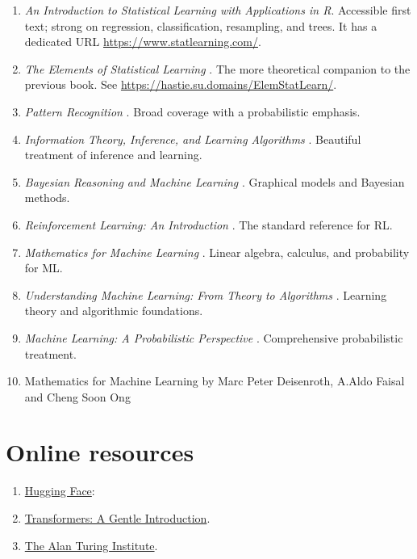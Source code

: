 \documentclass[a4paper, 12pt]{book}
\begin{document}
\begin{enumerate}
    \item \emph{An Introduction to Statistical Learning with Applications in R}\cite{james2021introduction}. Accessible first text; strong on regression, classification, resampling, and trees. It has a dedicated URL \url{https://www.statlearning.com/}.
    \item \emph{The Elements of Statistical Learning}
    \cite{hastie2009elements}. The more theoretical companion to the previous book. See \url{https://hastie.su.domains/ElemStatLearn/}.
    \item \emph{Pattern Recognition}
    \cite{theodoridis2006pattern}. Broad coverage with a probabilistic emphasis.
    \item \emph{Information Theory, Inference, and Learning Algorithms}
    \cite{mackay2003information}. Beautiful treatment of inference and learning.
    \item \emph{Bayesian Reasoning and Machine Learning}
    \cite{barber2012bayesian}. Graphical models and Bayesian methods.
    \item \emph{Reinforcement Learning: An Introduction}
    \cite{sutton1998reinforcement}. The standard reference for RL.
    \item \emph{Mathematics for Machine Learning}
    \cite{deisenroth2020mathematics}. Linear algebra, calculus, and probability for ML.
    \item \emph{Understanding Machine Learning: From Theory to Algorithms}
    \cite{shalev2014understanding}. Learning theory and algorithmic foundations.
    \item \emph{Machine Learning: A Probabilistic Perspective}
    \cite{murphy2012machine}. Comprehensive probabilistic treatment.
    \item Mathematics for Machine Learning by Marc Peter Deisenroth, A.Aldo Faisal and Cheng Soon Ong
\end{enumerate}

\section{Online resources}

\begin{enumerate}
    \item \href{https://huggingface.co/}{Hugging Face}:
    \item \href{https://alexsemendinger.github.io/transformers-gentle-introduction}{Transformers: A Gentle Introduction}.
    \item \href{https://www.turing.ac.uk/about-us}{The Alan Turing Institute}.
\end{enumerate}
\end{document}
